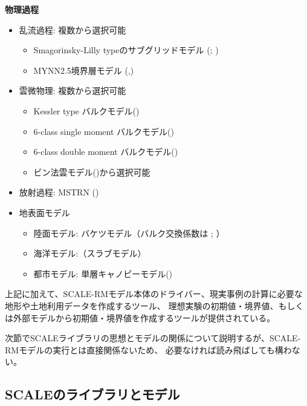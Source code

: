 {\bf 物理過程}

\begin{itemize}
 \item 乱流過程: 複数から選択可能
   \begin{itemize}
    \item Smagorinsky-Lilly typeのサブグリッドモデル (\cite{smagorinsky_1963}; \cite{lilly_1962})
    \item MYNN2.5境界層モデル (\cite{my_1982},\cite{nakanishi_2004})
   \end{itemize}
 \item 雲微物理: 複数から選択可能
   \begin{itemize}
    \item Kessler type バルクモデル(\cite{kessler_1969})
    \item 6-class single moment バルクモデル(\cite{tomita_2008})
    \item 6-class double moment バルクモデル(\cite{sn_2014})
    \item ビン法雲モデル(\cite{suzuki_etal_2010})から選択可能
   \end{itemize}
 \item 放射過程: MSTRN (\cite{sekiguchi_2008})
 \item 地表面モデル
  \begin{itemize}
   \item 陸面モデル: バケツモデル（バルク交換係数は \cite{beljaars_1991}; \cite{wilson_2001}）
   \item 海洋モデル:（スラブモデル）
   \item 都市モデル: 単層キャノピーモデル(\cite{kusaka_2001})
  \end{itemize}
\end{itemize}

上記に加えて、SCALE-RMモデル本体のドライバー、現実事例の計算に必要な地形や土地利用データを作成するツール、
理想実験の初期値・境界値、もしくは外部モデルから初期値・境界値を作成するツールが提供されている。

次節でSCALEライブラリの思想とモデルの関係について説明するが、SCALE-RMモデルの実行とは直接関係ないため、
必要なければ読み飛ばしても構わない。


\subsection{SCALEのライブラリとモデル}

